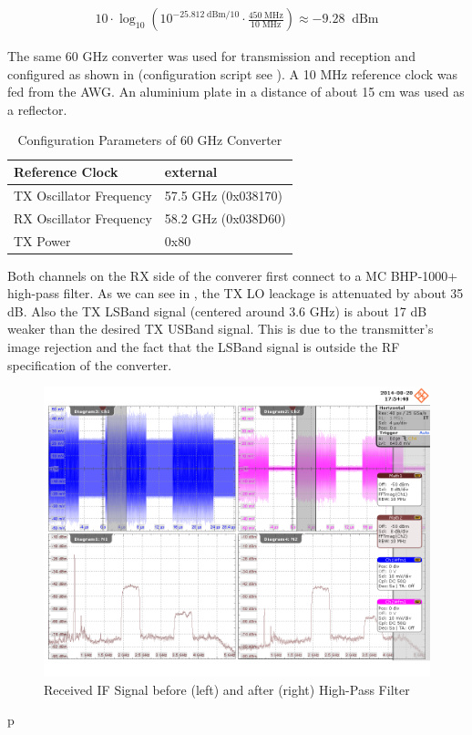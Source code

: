 \begin{align}
  10 \cdot \log_{10}\left(
  10^{-25.812 \;\text{dBm} / 10} \cdot
  \frac{450 \;\text{MHz}}{10 \;\text{MHz}}
  \right) \approx -9.28 \;\;\text{dBm}
  \label{eq:res_450_awg_pwr}
\end{align}

The same 60 GHz converter was used for transmission and reception and
configured as shown in  (configuration script
see ).
A 10 MHz reference clock was fed from the \gls{AWG}.
An aluminium plate in a distance of about 15 cm was used as a reflector. \\

\begin{table}[h]
  \centering
  \begin{tabular}{|l|l|}
    \hline
    Reference Clock & external \\ \hline
    TX Oscillator Frequency & 57.5 GHz (0x038170) \\ \hline
    RX Oscillator Frequency & 58.2 GHz (0x038D60) \\ \hline
    TX Power & 0x80 \\ \hline
  \end{tabular}
  \caption{Configuration Parameters of 60 GHz Converter}
  \label{tab:res_450}
\end{table}

Both channels on the \gls{RX} side of the converer first connect to a
\gls{MC} BHP-1000+ high-pass filter. As we can see in ,
the \gls{TX} \gls{LO} leackage is attenuated by about 35 dB. Also the \gls{TX}
\gls{LSBand} signal (centered around 3.6 GHz) is about 17 dB weaker than
the desired \gls{TX} \gls{USBand} signal. This is due to the transmitter's
image rejection and the fact that the \gls{LSBand} signal is outside the
\gls{RF} specification of the converter. \\

\begin{figure}[p]
  \centering
  \includegraphics[width=\textwidth]{figures/osci/res_450_rx_if}
  \caption{Received \gls{IF} Signal before (left) and after (right) High-Pass Filter}
  \label{fig:res_450_rx_if}
\end{figure}p

